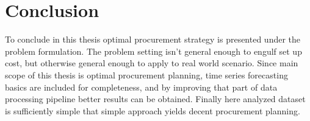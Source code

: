 
\chapter{Conclusion}

To conclude in this thesis optimal procurement strategy is presented under the problem formulation. The problem setting isn't general enough to engulf set up cost, but otherwise general enough to apply to real world scenario.
Since main scope of this thesis is optimal procurement planning, time series forecasting basics are included for completeness, and by improving that part of data processing pipeline better results can be obtained.
Finally here analyzed dataset is sufficiently simple that simple approach yields decent procurement planning. 
